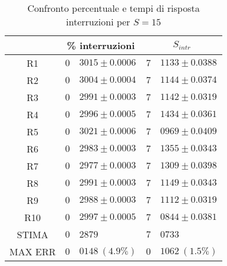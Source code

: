 \begin{table}[!h]
\begin{tabular}{c|r@{.}l|r@{.}l}
& \multicolumn{2}{|c|}{\% interruzioni}
& \multicolumn{2}{|c}{$S_{intr}$}
\\          
\hline
R1      & $0$&$3015 \pm 0.0006$ & $7$&$1133 \pm 0.0388$ \\
R2      & $0$&$3004 \pm 0.0004$ & $7$&$1144 \pm 0.0374$ \\
R3      & $0$&$2991 \pm 0.0003$ & $7$&$1142 \pm 0.0319$ \\
R4      & $0$&$2996 \pm 0.0005$ & $7$&$1434 \pm 0.0361$ \\
R5      & $0$&$3021 \pm 0.0006$ & $7$&$0969 \pm 0.0409$ \\
R6      & $0$&$2983 \pm 0.0003$ & $7$&$1355 \pm 0.0343$ \\
R7      & $0$&$2977 \pm 0.0003$ & $7$&$1309 \pm 0.0398$ \\
R8      & $0$&$2991 \pm 0.0003$ & $7$&$1149 \pm 0.0343$ \\
R9      & $0$&$2988 \pm 0.0003$ & $7$&$1112 \pm 0.0319$ \\
R10     & $0$&$2997 \pm 0.0005$ & $7$&$0844 \pm 0.0381$ \\
STIMA   & $0$&$2879$            & $7$&$0733$            \\
MAX ERR & $0$&$0148 \ (4.9\%)$  & $0$&$1062 \ (1.5\%)$    
\end{tabular}
\centering
\caption{Confronto percentuale e tempi di risposta interruzioni per $S=15$}
\label{tab:15_sintr}
\end{table}
